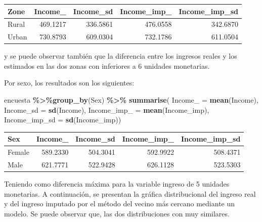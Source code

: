 \documentclass[
  12pt,
]{book}
\newenvironment{Shaded}{\begin{snugshade}}{\end{snugshade}}
\newcommand{\AttributeTok}[1]{\textcolor[rgb]{0.13,0.29,0.53}{#1}}
\newcommand{\FunctionTok}[1]{\textcolor[rgb]{0.13,0.29,0.53}{\textbf{#1}}}
\newcommand{\NormalTok}[1]{#1}
\newcommand{\SpecialCharTok}[1]{\textcolor[rgb]{0.81,0.36,0.00}{\textbf{#1}}}
\begin{document}
\begin{tabular}{l|r|r|r|r}
\hline
Zone & Income\_ & Income\_sd & Income\_imp\_ & Income\_imp\_sd\\
\hline
Rural & 469.1217 & 336.5861 & 476.0558 & 342.6870\\
\hline
Urban & 730.8793 & 609.0304 & 732.1786 & 611.0504\\
\hline
\end{tabular}

y se puede observar también que la diferencia entre los ingresos reales y los estimados en las dos zonas con inferiores a 6 unidades monetarias.

Por sexo, los resultados son los siguientes:

\begin{Shaded}
\begin{Highlighting}[]
\NormalTok{encuesta }\SpecialCharTok{\%\textgreater{}\%}\FunctionTok{group\_by}\NormalTok{(Sex) }\SpecialCharTok{\%\textgreater{}\%}  \FunctionTok{summarise}\NormalTok{(}
  \AttributeTok{Income\_ =} \FunctionTok{mean}\NormalTok{(Income),}
  \AttributeTok{Income\_sd =} \FunctionTok{sd}\NormalTok{(Income),}
  \AttributeTok{Income\_imp\_ =} \FunctionTok{mean}\NormalTok{(Income\_imp),}
  \AttributeTok{Income\_imp\_sd =} \FunctionTok{sd}\NormalTok{(Income\_imp))}
\end{Highlighting}
\end{Shaded}

\begin{tabular}{l|r|r|r|r}
\hline
Sex & Income\_ & Income\_sd & Income\_imp\_ & Income\_imp\_sd\\
\hline
Female & 589.2330 & 504.3041 & 592.9922 & 508.4371\\
\hline
Male & 621.7771 & 522.9428 & 626.1128 & 523.5303\\
\hline
\end{tabular}

Teniendo como diferencia máxima para la variable ingreso de 5 unidades monetarias. A continuación, se presentan la gráfica distribucional del ingreso real y del ingreso imputado por el método del vecino más cercano mediante un modelo. Se puede observar que, las dos distribuciones con muy similares.
\end{document}
